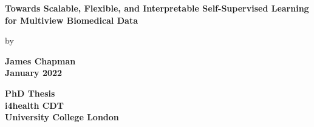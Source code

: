 \documentclass{report}
\author{James Chapman}
\numberwithin{figure}{chapter}
\numberwithin{table}{section}
\begin{document}
\begin{titlepage}
    \begin{center}
        {\LARGE\textbf{Towards Scalable, Flexible, and Interpretable Self-Supervised Learning for Multiview Biomedical Data}
            \author{James Chapman\\
                \\}}

        \vspace{0.8cm}
        by\\
        \vspace{0.8cm}

        {\LARGE\textbf{James Chapman\\}}
        \vspace{1.5cm}
        {\LARGE\textbf{January 2022}}

        \vfill

        \textbf{
            PhD Thesis\\
            \vspace{1cm}
            i4health CDT\\
            University College London\\}

        \vspace{2cm}
    \end{center}
\end{titlepage}

\onehalfspacing

\newpage


\newpage


\newpage


\newpage


% 

\newpage
\listoffigures

\newpage
\listoftables
\end{document}
